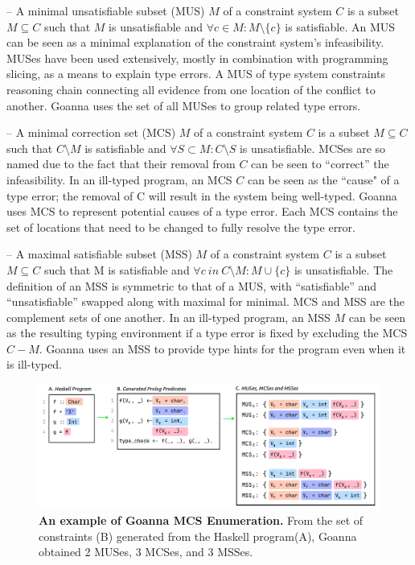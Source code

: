 \documentclass[pdflatex,lineno,sn-nature,Numbered]{sn-jnl}%
\begin{document}
    – A minimal unsatisfiable subset (MUS) $M$ of a constraint system $C$ is a subset $M \subseteq C$ such that $M$ is unsatisfiable and $ \forall{c} \in M : M \setminus \{c\}$ is satisfiable. An MUS can be seen as a minimal explanation of the constraint system’s infeasibility. MUSes have been used extensively, mostly in combination with programming slicing, as a means to explain type errors. A MUS of type system constraints reasoning chain connecting all evidence from one location of the conflict to another. Goanna uses the set of all MUSes to group related type errors.

    – A minimal correction set (MCS) $M$ of a constraint system $C$ is a subset $M \subseteq C$ such that $C \setminus M$ is satisfiable and $\forall{S} \subset M : C \setminus S$ is unsatisfiable. MCSes are so named due to the fact that their removal from $C$ can be seen to “correct” the infeasibility. In an ill-typed program, an MCS $C$ can be seen as the ``cause" of a type error; the removal of C will result in the system being well-typed. Goanna uses MCS to represent potential causes of a type error. Each MCS contains the set of locations that need to be changed to fully resolve the type error.

    – A maximal satisfiable subset (MSS) $M$ of a constraint system $C$ is a subset $M \subseteq C$ such that M is satisfiable and $\forall{c}\ in\ C \setminus M:M\cup\{c\}$ is unsatisfiable. The definition of an MSS is symmetric to that of a MUS, with “satisfiable” and “unsatisfiable” swapped along with maximal for minimal. MCS and MSS are the complement sets of one another. In an ill-typed program, an MSS $M$ can be seen as the resulting typing environment if a type error is fixed by excluding the MCS $C - M$. Goanna uses an MSS to provide type hints for the program even when it is ill-typed.
 
     \begin{figure}[ht!]
        \centering
        \includegraphics[width=\linewidth]{images/Enumeration-Example}
        \caption{\textbf{An example of Goanna MCS Enumeration.} From the set of constraints (B) generated from the Haskell program(A), Goanna obtained 2 MUSes, 3 MCSes, and 3 MSSes. }
        \label{fig:enumeration-example}
    \end{figure}
    
\end{document}

